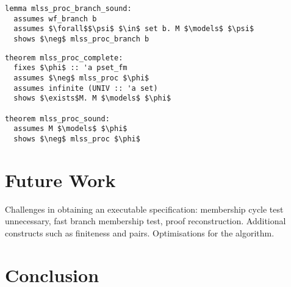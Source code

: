 \documentclass[sigplan,10pt,anonymous,review]{acmart}
\begin{document}
\begin{lstlisting}
lemma mlss_proc_branch_sound:
  assumes wf_branch b
  assumes $\forall$$\psi$ $\in$ set b. M $\models$ $\psi$
  shows $\neg$ mlss_proc_branch b
\end{lstlisting}

\begin{lstlisting}
theorem mlss_proc_complete:
  fixes $\phi$ :: 'a pset_fm
  assumes $\neg$ mlss_proc $\phi$
  assumes infinite (UNIV :: 'a set)
  shows $\exists$M. M $\models$ $\phi$

theorem mlss_proc_sound:
  assumes M $\models$ $\phi$
  shows $\neg$ mlss_proc $\phi$
\end{lstlisting}

\section{Future Work}
Challenges in obtaining an executable specification: membership cycle test unnecessary, fast branch membership test, proof reconstruction.
Additional constructs such as finiteness and pairs.
Optimisations for the algorithm.

\section{Conclusion}

\begin{acks}
\end{acks}



\end{document}
